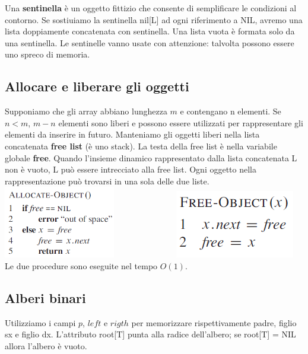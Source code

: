\documentclass[11pt,a4paper]{article}
\begin{document}
%
Una \textbf{sentinella} è un oggetto fittizio che consente di semplificare le condizioni al contorno.
Se sostiuiamo la sentinella nil[L] ad ogni riferimento a NIL, avremo una lista doppiamente concatenata con
sentinella.
Una lista vuota è formata solo da una sentinella.
Le sentinelle vanno usate con attenzione: talvolta possono essere uno spreco di memoria.

\subsection{Allocare e liberare gli oggetti}
Supponiamo che gli array abbiano lunghezza $m$ e contengano n elementi. Se $n < m$, $m-n$ elementi sono liberi
e possono essere utilizzati per rappresentare gli elementi da inserire in futuro. Manteniamo gli oggetti liberi
nella lista concatenata \textbf{free list} (è uno stack). La testa della free list è nella variabile globale \textbf{free}. Quando
l’insieme dinamico rappresentato dalla lista concatenata L non è vuoto, L può essere intrecciato alla free list.
Ogni oggetto nella rappresentazione può trovarsi in una sola delle due liste.\medskip\\
\includegraphics[scale=0.8]{img/allocare.png}\ \ \ \ \ \ \ \ \ \ \ \ \ \ \
\includegraphics[scale=0.4]{img/deallocare.png}\medskip\\
Le due procedure sono eseguite nel tempo $O(1)$.

\subsection{Alberi binari}
Utilizziamo i campi $p$, $left$ e $rigth$ per memorizzare rispettivamente padre, figlio sx e figlio dx. L’attributo
root[T] punta alla radice dell’albero; se root[T] = NIL allora l’albero è vuoto.
\end{document}

